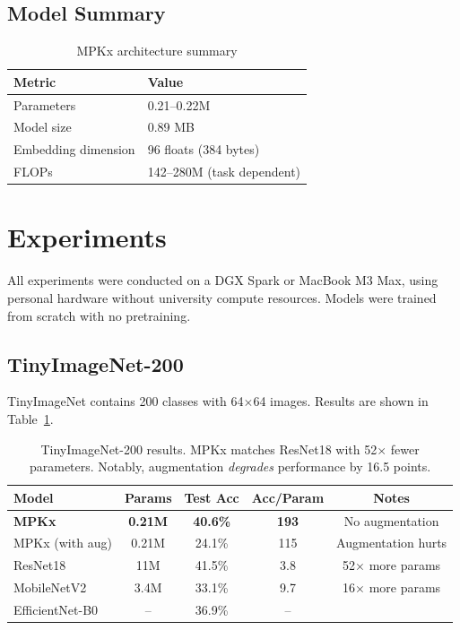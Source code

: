 \documentclass[11pt]{article}
\begin{document}
\subsection{Model Summary}

\begin{table}[h]
\centering
\begin{tabular}{ll}
\toprule
\textbf{Metric} & \textbf{Value} \\
\midrule
Parameters & 0.21--0.22M \\
Model size & 0.89 MB \\
Embedding dimension & 96 floats (384 bytes) \\
FLOPs & 142--280M (task dependent) \\
\bottomrule
\end{tabular}
\caption{MPKx architecture summary}
\end{table}

\section{Experiments}

All experiments were conducted on a DGX Spark or MacBook M3 Max, using personal hardware without university compute resources. Models were trained from scratch with no pretraining.

\subsection{TinyImageNet-200}

TinyImageNet contains 200 classes with 64$\times$64 images. Results are shown in Table~\ref{tab:tinyimagenet}.

\begin{table}[h]
\centering
\begin{tabular}{lcccc}
\toprule
\textbf{Model} & \textbf{Params} & \textbf{Test Acc} & \textbf{Acc/Param} & \textbf{Notes} \\
\midrule
\textbf{MPKx} & \textbf{0.21M} & \textbf{40.6\%} & \textbf{193} & No augmentation \\
MPKx (with aug) & 0.21M & 24.1\% & 115 & Augmentation hurts \\
ResNet18 & 11M & 41.5\% & 3.8 & 52$\times$ more params \\
MobileNetV2 & 3.4M & 33.1\% & 9.7 & 16$\times$ more params \\
EfficientNet-B0 & -- & 36.9\% & -- & \\
\bottomrule
\end{tabular}
\caption{TinyImageNet-200 results. MPKx matches ResNet18 with 52$\times$ fewer parameters. Notably, augmentation \textit{degrades} performance by 16.5 points.}
\label{tab:tinyimagenet}
\end{table}
\end{document}
